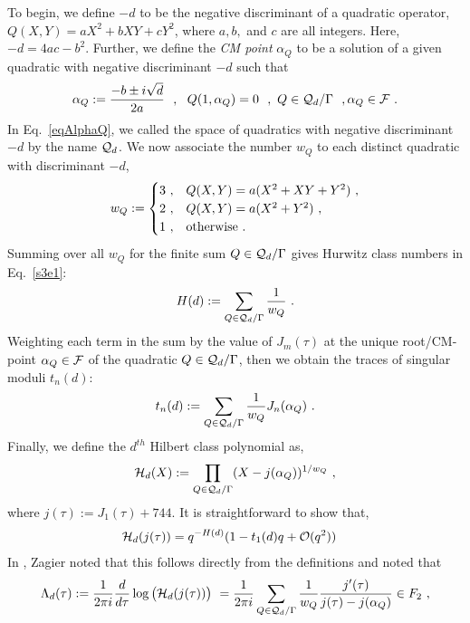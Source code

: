 \documentclass[11pt,a4paper]{article}
\newcommand{\G}{\Gamma}
\begin{document}
To begin, we define $-d$ to be the negative discriminant of a quadratic operator, $Q(X,Y) = a X^2 + b XY + c Y^2$, where $a,b,$ and $c$ are all integers. Here, $-d= 4 a c - b^2$. Further, we define the {\em CM point} $\alpha_Q$ to be a solution of a given quadratic with negative discriminant $-d$ such that
\begin{align}
\alpha_Q:= \frac{-b \pm i \sqrt{d}}{2a}~~,~~Q(1,\alpha_Q) = 0~~,~Q \in {\cal Q}_d/\G~~,\alpha_Q \in {\cal F}~. \label{eqAlphaQ}
\end{align} 
In Eq.~\eqref{eqAlphaQ}, we called the space of quadratics with negative discriminant $-d$ by the name ${\cal Q}_d$. We now associate the number $w_Q$ to each distinct quadratic with discriminant $-d$,
\begin{align} 
w_Q:= 
\begin{cases}
3~, & Q(X,Y) = a(X^2 + XY + Y^2)~,\\ 
2~, & Q(X,Y) = a(X^2 + Y^2)~,\\
1~, & {\rm otherwise}~.
\end{cases}
\label{eqWq}
\end{align}
Summing over all $w_Q$ for the finite sum $Q \in {\cal Q}_d/\G$ gives Hurwitz class numbers in Eq.~\eqref{s3e1}:
\begin{align}
H(d) := \sum_{Q \in {\cal Q}_d/\G} \frac{1}{w_Q}~.\label{eqHd}
\end{align}
Weighting each term in the sum by the value of $J_m(\tau)$ at the unique root/CM-point $\alpha_Q \in {\cal F}$ of the quadratic $Q \in {\cal Q}_d/\G$, then we obtain the traces of singular moduli $t_n(d)$:
\begin{align}
t_n(d) :=  \sum_{Q \in {\cal Q}_d/\G} \frac{1}{w_Q}J_n(\alpha_Q)~.\label{eqTrD}
\end{align}
Finally, we define the $d^{th}$ Hilbert class polynomial as,
\begin{align}
{\cal H}_d(X) := \prod_{Q \in {\cal Q}_d/\G} (X - j(\alpha_Q))^{1/w_Q}~,\label{eqHxD}
\end{align}
where $j(\tau):= J_1(\tau) + 744$. It is straightforward to show that,
\begin{align}
{\cal H}_d(j(\tau)) &= q^{-H(d)} (1- t_1(d) q+ {\cal O}(q^2))
\end{align}
In \cite{02-TSM}, Zagier noted that this follows directly from the definitions and noted that
\begin{align}
\Lambda_d(\tau) 
  := \frac{1}{2 \pi i } \frac{d}{d\tau} \log\big({\cal H}_d(j(\tau)) \big) 
~ = \frac{1}{2 \pi i } \sum_{Q \in {\cal Q}_d/\G} \frac{1}{w_Q} \frac{j'(\tau)}{j(\tau) - j(\alpha_Q)} \in F_2~, \label{eqLambdaD2}
\end{align}
\end{document}
